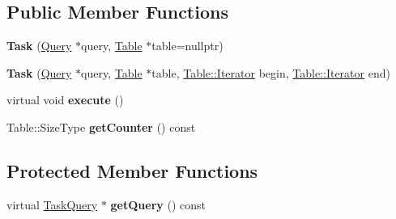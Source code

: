 \subsection*{Public Member Functions}
\begin{DoxyCompactItemize}
\item 
\mbox{\label{class_task_af0449cba22c5a93fea99a5cb100a24e9}} 
{\bfseries Task} (\hyperlink{class_query}{Query} $\ast$query, \hyperlink{class_table}{Table} $\ast$table=nullptr)
\item 
\mbox{\label{class_task_aa42dbfc5b52058cdc161d7a8b7b023bf}} 
{\bfseries Task} (\hyperlink{class_query}{Query} $\ast$query, \hyperlink{class_table}{Table} $\ast$table, \hyperlink{class_table_1_1_iterator_impl}{Table\+::\+Iterator} begin, \hyperlink{class_table_1_1_iterator_impl}{Table\+::\+Iterator} end)
\item 
\mbox{\label{class_task_ade38031c3ed134ec20cbbcd58e575745}} 
virtual void {\bfseries execute} ()
\item 
\mbox{\label{class_task_a2b5770928a7e40b46ec339d67f747b32}} 
Table\+::\+Size\+Type {\bfseries get\+Counter} () const
\end{DoxyCompactItemize}
\subsection*{Protected Member Functions}
\begin{DoxyCompactItemize}
\item 
\mbox{\label{class_task_a755ffdd69b2a9e69afa239a7cf5bb768}} 
virtual \hyperlink{class_task_query}{Task\+Query} $\ast$ {\bfseries get\+Query} () const
\end{DoxyCompactItemize}

